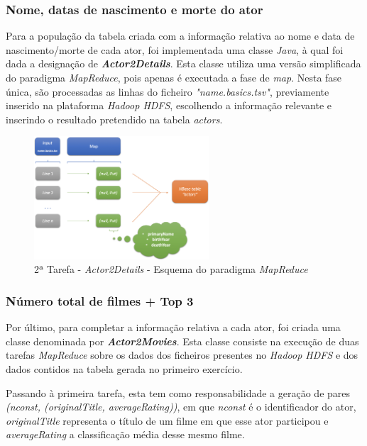 \documentclass[a4paper]{report}
\begin{document}
{			\subsubsection{Nome, datas de nascimento e morte do ator} \label{sssec:Task2-3-1}
			Para a população da tabela criada com a informação relativa ao nome e data de nascimento/morte de cada ator, foi implementada uma classe \textit{Java}, à qual foi dada a designação de \textbf{\textit{Actor2Details}}.
			Esta classe utiliza uma versão simplificada do paradigma \textit{MapReduce}, pois apenas é executada a fase de \textit{map}.
			Nesta fase única, são processadas as linhas do ficheiro \textit{"name.basics.tsv"}, previamente inserido na plataforma \textit{Hadoop HDFS}, escolhendo a informação relevante e inserindo o resultado pretendido na tabela \textit{actors}.
			\begin{figure}[H]
				\centering
				\includegraphics[width=0.58\textwidth]{Imagens/2ª Tarefa - Actor2Details - Esquema MapReduce.png}
				\caption{2ª Tarefa - \textit{Actor2Details} - Esquema do paradigma \textit{MapReduce}}
				\label{fig:18}
			\end{figure}

			\subsubsection{Número total de filmes + Top 3} \label{sssec:Task2-3-2}
			Por último, para completar a informação relativa a cada ator, foi criada uma classe denominada por \textbf{\textit{Actor2Movies}}. Esta classe consiste na execução de duas tarefas \textit{MapReduce} sobre os dados dos ficheiros presentes no \textit{Hadoop HDFS} e dos dados contidos na tabela gerada no primeiro exercício.
			
			Passando à primeira tarefa, esta tem como responsabilidade a geração de pares \textit{(nconst, (originalTitle, averageRating))}, em que \textit{nconst} é o identificador do ator, \textit{originalTitle} representa o título de um filme em que esse ator participou e \textit{averageRating} a classificação média desse mesmo filme.
			
}
\end{document}
